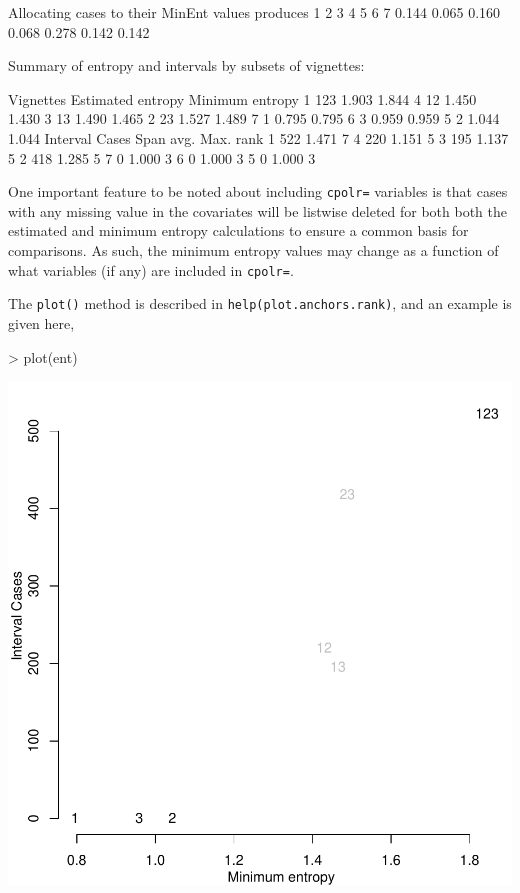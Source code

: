 \documentclass{amsart}
\newcommand{\code}[1]{{\texttt{#1}}}
\begin{document}
\begin{Schunk}
\begin{Soutput}
Allocating cases to their MinEnt values produces
    1     2     3     4     5     6     7 
0.144 0.065 0.160 0.068 0.278 0.142 0.142 

Summary of entropy and intervals by subsets of vignettes:

  Vignettes Estimated entropy Minimum entropy
1       123             1.903           1.844
4        12             1.450           1.430
3        13             1.490           1.465
2        23             1.527           1.489
7         1             0.795           0.795
6         3             0.959           0.959
5         2             1.044           1.044
  Interval Cases Span avg. Max. rank
1            522     1.471         7
4            220     1.151         5
3            195     1.137         5
2            418     1.285         5
7              0     1.000         3
6              0     1.000         3
5              0     1.000         3
\end{Soutput}
\end{Schunk}
One important feature to be noted about including
\code{cpolr=} variables is that cases with any missing value in the
covariates will be listwise deleted for both both the estimated and
minimum entropy calculations to ensure a common basis for comparisons.
As such, the minimum entropy values may change as a function of what
variables (if any) are included in \code{cpolr=}.

The {\tt plot()} method is described in
\code{help(plot.anchors.rank)}, and an example is given here,
\begin{Schunk}
\begin{Sinput}
> plot(ent)
\end{Sinput}
\end{Schunk}
\includegraphics{anchors-entropy1}
\end{document}
